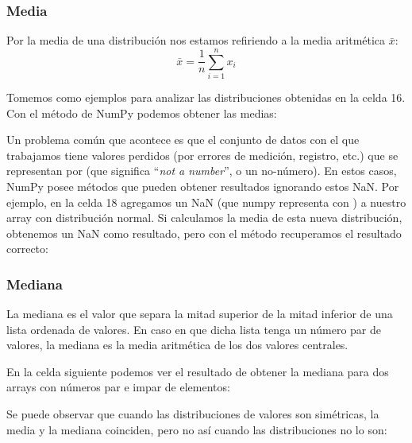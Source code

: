 \subsubsection{Media}

Por la media de una distribución nos estamos refiriendo a la media aritmética $\bar{x}$:
\begin{equation*}
    \bar{x} = \frac{1}{n} \sum_{i=1}^n x_i
\end{equation*}

Tomemos como ejemplos para analizar las distribuciones obtenidas en la celda 16. Con el método  de NumPy podemos obtener las medias:


Un problema común que acontece es que el conjunto de datos con el que trabajamos tiene valores perdidos (por errores de medición, registro, etc.) que se representan por  (que significa ``\textit{not a number}'', o un no-número). En estos casos, NumPy posee métodos que pueden obtener resultados ignorando estos NaN. Por ejemplo, en la celda 18 agregamos un NaN (que numpy representa con ) a nuestro array con distribución normal. Si calculamos la media de esta nueva distribución, obtenemos un NaN como resultado, pero con el método  recuperamos el resultado correcto:


\subsubsection{Mediana}

La mediana es el valor que separa la mitad superior de la mitad inferior de una lista ordenada de valores. En caso en que dicha lista tenga un número par de valores, la mediana es la media aritmética de los dos valores centrales.

En la celda siguiente podemos ver el resultado de obtener la mediana para dos arrays con números par e impar de elementos:


Se puede observar que cuando las distribuciones de valores son simétricas, la media y la mediana coinciden, pero no así cuando las distribuciones no lo son:


